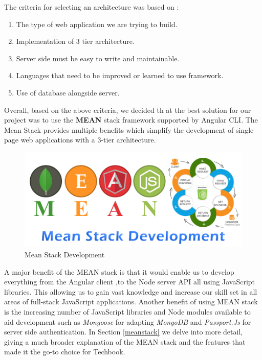 The criteria for selecting an architecture was based on :
\begin{enumerate}
  \item The type of web application we are trying to build.
  \item Implementation of 3 tier architecture.
  \item Server side must be easy to write and maintainable.
  \item Languages that need to be improved or learned to use framework.
  \item Use of database alongside server.
\end{enumerate}
Overall, based on the above criteria, we decided th         at the best solution for our project was to use the \textbf{MEAN} stack framework supported by Angular CLI. The Mean Stack provides multiple benefits which simplify the development of single page web applications with a 3-tier architecture. 

\begin{figure}[H]
  \includegraphics[width=\linewidth]{img/msd.png}
  \caption{Mean Stack Development}
  \label{fig:mena-stack}
\end{figure}

A major benefit of the MEAN stack is that it would enable us to develop everything from the Angular client ,to the Node server API all using JavaScript libraries. This allowing us to gain vast knowledge and increase our skill set in all areas of full-stack JavaScript applications. Another benefit of using MEAN stack is the increasing number of JavaScript libraries and Node modules available to aid development such as \textit{Mongoose} for adapting \textit{MongoDB} and \textit{Passport.Js} for server side authentication. In Section \ref{meanstack} we delve into more detail, giving a much broader explanation of the MEAN stack and the features that made it the go-to choice for Techbook.


